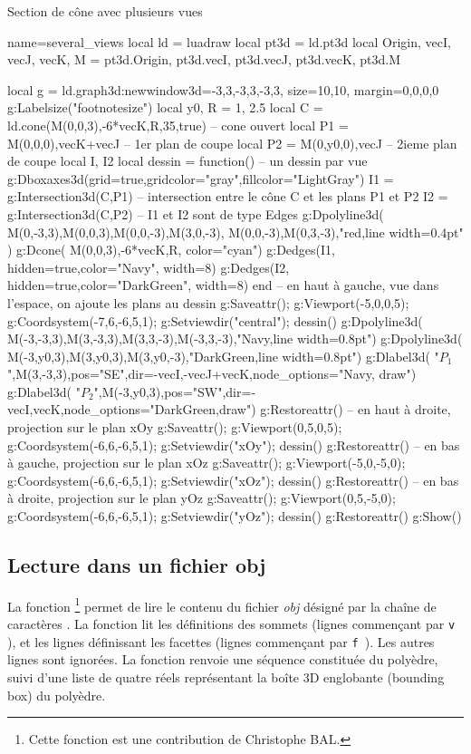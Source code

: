 \begin{demo}{Section de cône avec plusieurs vues}
\begin{luadraw}{name=several_views}
local ld = luadraw
local pt3d = ld.pt3d
local Origin, vecI, vecJ, vecK, M = pt3d.Origin, pt3d.vecI, pt3d.vecJ, pt3d.vecK, pt3d.M

local g = ld.graph3d:new{window3d={-3,3,-3,3,-3,3}, size={10,10}, margin={0,0,0,0}}
g:Labelsize("footnotesize")
local y0, R = 1, 2.5
local C = ld.cone(M(0,0,3),-6*vecK,R,35,true) -- cone ouvert
local P1 = {M(0,0,0),vecK+vecJ} -- 1er plan de coupe
local P2 = {M(0,y0,0),vecJ} -- 2ieme plan de coupe
local I, I2
local dessin = function() -- un dessin par vue
    g:Dboxaxes3d({grid=true,gridcolor="gray",fillcolor="LightGray"})
    I1 = g:Intersection3d(C,P1) -- intersection entre le cône C et les plans P1 et P2
    I2 = g:Intersection3d(C,P2) -- I1 et I2 sont de type Edges
    g:Dpolyline3d( {{M(0,-3,3),M(0,0,3),M(0,0,-3),M(3,0,-3)}, {M(0,0,-3),M(0,3,-3)}},"red,line width=0.4pt" )
    g:Dcone( M(0,0,3),-6*vecK,R, {color="cyan"})
    g:Dedges(I1, {hidden=true,color="Navy", width=8})
    g:Dedges(I2, {hidden=true,color="DarkGreen", width=8})
end
-- en haut à gauche, vue dans l'espace, on ajoute les plans au dessin
g:Saveattr(); g:Viewport(-5,0,0,5); g:Coordsystem(-7,6,-6,5,1); g:Setviewdir("central"); dessin()
g:Dpolyline3d( {M(-3,-3,3),M(3,-3,3),M(3,3,-3),M(-3,3,-3)},"Navy,line width=0.8pt")
g:Dpolyline3d( {M(-3,y0,3),M(3,y0,3),M(3,y0,-3)},"DarkGreen,line width=0.8pt")
g:Dlabel3d( "$P_1$",M(3,-3,3),{pos="SE",dir={-vecI,-vecJ+vecK},node_options="Navy, draw"})
g:Dlabel3d( "$P_2$",M(-3,y0,3),{pos="SW",dir={-vecI,vecK},node_options="DarkGreen,draw"})
g:Restoreattr()
-- en haut à droite, projection sur le plan xOy
g:Saveattr(); g:Viewport(0,5,0,5); g:Coordsystem(-6,6,-6,5,1); g:Setviewdir("xOy"); dessin()
g:Restoreattr()
-- en bas à gauche, projection sur le plan xOz
g:Saveattr(); g:Viewport(-5,0,-5,0); g:Coordsystem(-6,6,-6,5,1); g:Setviewdir("xOz"); dessin()
g:Restoreattr()
-- en bas à droite, projection sur le plan yOz
g:Saveattr(); g:Viewport(0,5,-5,0); g:Coordsystem(-6,6,-6,5,1); g:Setviewdir("yOz"); dessin()
g:Restoreattr()
g:Show()
\end{luadraw}
\end{demo}

\subsection{Lecture dans un fichier obj}

La fonction \footnote{Cette fonction est une contribution de Christophe BAL.} permet de lire le contenu du fichier \emph{obj} désigné par la chaîne de caractères . La fonction lit les définitions des sommets (lignes commençant par \verb|v |), et les lignes définissant les facettes (lignes commençant par \verb|f |). Les autres lignes sont ignorées. La fonction renvoie une séquence constituée du polyèdre, suivi d'une liste de quatre réels  représentant la boîte 3D englobante (bounding box) du polyèdre.

